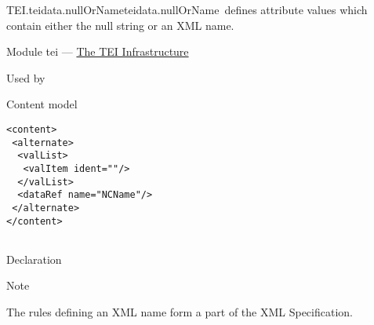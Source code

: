 \begin{reflist}
\item[]\begin{specHead}{TEI.teidata.nullOrName}{teidata.nullOrName} defines attribute values which contain either the null string or an XML name.\end{specHead} 
    \item[{Module}]
  tei — \hyperref[ST]{The TEI Infrastructure}
    \item[{Used by}]
  
    \item[{Content model}]
  \mbox{}\hfill\\[-10pt]\begin{Verbatim}[fontsize=\small]
<content>
 <alternate>
  <valList>
   <valItem ident=""/>
  </valList>
  <dataRef name="NCName"/>
 </alternate>
</content>
    
\end{Verbatim}

    \item[{Declaration}]
    \item[{Note}]
  \par
The rules defining an XML name form a part of the XML Specification.
\end{reflist}  
